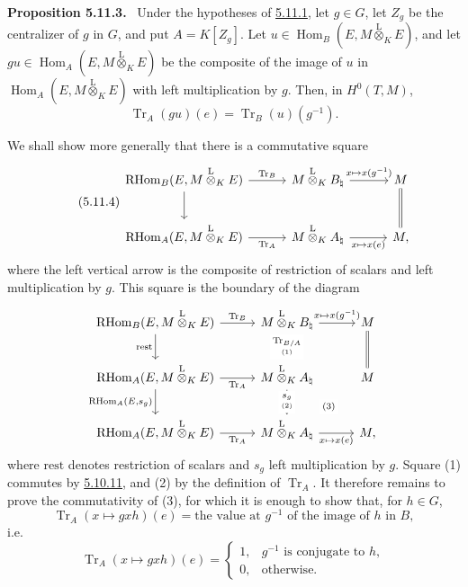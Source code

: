\documentclass[11pt]{article}
\newenvironment{statement}[1]{\par\medskip\noindent\textbf{#1.}\ }{\par\medskip}
\DeclareMathOperator{\Hom}{Hom}
\providecommand{\RHom}{\mathrm{RHom}}
\providecommand{\Tr}{\operatorname{Tr}}
\providecommand{\Tr}{\operatorname{Tr}}
\providecommand{\lten}{\overset{\mathrm L}{\otimes}}
\providecommand{\Tr}{\operatorname{Tr}}
\providecommand{\RHom}{\mathrm{RHom}}
\providecommand{\Hom}{\operatorname{Hom}}
\providecommand{\lten}{\overset{\mathrm L}{\otimes}}
\providecommand{\RHom}{\mathrm R\mathcal{H}om}
\providecommand{\lten}{\overset{\mathrm L}{\otimes}}
\providecommand{\Tr}{\operatorname{Tr}}
\providecommand{\lten}{\overset{\mathrm L}{\otimes}}
\providecommand{\lten}{\overset{\mathrm L}{\otimes}}
\providecommand{\lten}{\overset{\mathrm L}{\otimes}}
\providecommand{\RHom}{\mathrm{RHom}}
\providecommand{\Hom}{\operatorname{Hom}}
\providecommand{\Tr}{\operatorname{Tr}}
\providecommand{\lten}{\overset{\mathrm L}{\otimes}}
\begin{document}
\label{sga5:IIIB:proposition:5.11.3}\begin{statement}{Proposition 5.11.3}
Under the hypotheses of \hyperref[sga5:IIIB:proposition:5.11.1]{5.11.1}, let $g\in G$, let $Z_g$ be the centralizer of $g$ in $G$, and put $A=K[Z_g]$. Let $u\in\Hom_B(E,M\lten_KE)$, and let $gu\in\Hom_A(E,M\lten_KE)$ be the composite of the image of $u$ in $\Hom_A(E,M\lten_KE)$ with left multiplication by $g$. Then, in $H^0(T,M)$,
\[
\Tr_A(gu)(e)=\Tr_B(u)(g^{-1}).
\]
\end{statement}

We shall show more generally that there is a commutative square
\begin{equation}\tag{5.11.4}\label{sga5:IIIB:equation:5.11.4}
\begin{tikzcd}[column sep=3.0em,row sep=2.2em]
\RHom_B(E,M\lten_KE) \arrow[r,"\Tr_B"] \arrow[d] &
M\lten_KB_\natural \arrow[r,"{x\mapsto x(g^{-1})}"] &
M \arrow[d,equal] \\
\RHom_A(E,M\lten_KE) \arrow[r,"\Tr_A"'] &
M\lten_KA_\natural \arrow[r,"{x\mapsto x(e)}"'] &
M,
\end{tikzcd}
\end{equation}
where the left vertical arrow is the composite of restriction of scalars and left multiplication by $g$. This square is the boundary of the diagram
\[
\begin{tikzcd}[column sep=2.8em,row sep=2.0em]
\RHom_B(E,M\lten_KE) \arrow[r,"\Tr_B"] \arrow[d,"\mathrm{rest}"'] &
M\lten_KB_\natural \arrow[r,"{x\mapsto x(g^{-1})}"] \arrow[d,"{\underset{(1)}{\Tr_{B/A}}}" description] &
M \arrow[d,equal] \\
\RHom_A(E,M\lten_KE) \arrow[r,"\Tr_A"'] \arrow[d,"{\RHom_A(E,s_g)}"'] &
M\lten_KA_\natural \arrow[d,"{\underset{(2)}{s_g}}" description] \arrow[dr,phantom,"\scriptstyle(3)" description] &
M \\
\RHom_A(E,M\lten_KE) \arrow[r,"\Tr_A"'] &
M\lten_KA_\natural \arrow[r,"{x\mapsto x(e)}"'] &
M,
\end{tikzcd}
\]
where $\mathrm{rest}$ denotes restriction of scalars and $s_g$ left multiplication by $g$. Square (1) commutes by \hyperref[sga5:IIIB:corollary:5.10.11]{5.10.11}, and (2) by the definition of $\Tr_A$. It therefore remains to prove the commutativity of (3), for which it is enough to show that, for $h\in G$,
\[
\Tr_A(x\mapsto gxh)(e)=\text{the value at }g^{-1}\text{ of the image of }h\text{ in }B,
\]
i.e.
\begin{equation}\tag{*}\label{sga5:IIIB:equation:unnumbered:6}
\Tr_A(x\mapsto gxh)(e)=
\begin{cases}
1,& g^{-1}\text{ is conjugate to }h,\\
0,& \text{otherwise}.
\end{cases}
\end{equation}
\end{document}
